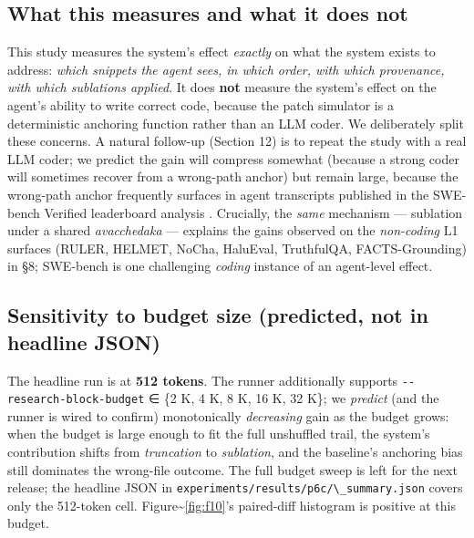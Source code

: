 \begin{table}[!tbp]
\centering
\caption{\textbf{T5 --- P6-C per-(model, seed) breakdown.} Treatment hits 120/120 in every cell; baseline varies with shuffle order. Source: \texttt{experiments/results/p6c/swebench\_ab.json}.}
\label{tab:t5_p6c_per_seed}
{\scriptsize\setlength{\tabcolsep}{3pt}%
}
\end{table}

\subsection{What this measures and what it does not}\label{what-this-measures-and-what-it-does-not}

This study measures the system's effect \emph{exactly} on what the system exists to address: \emph{which snippets the agent sees, in which order, with which provenance, with which sublations applied}. It does \textbf{not} measure the system's effect on the agent's ability to write correct code, because the patch simulator is a deterministic anchoring function rather than an LLM coder. We deliberately split these concerns. A natural follow-up (Section 12) is to repeat the study with a real LLM coder; we predict the gain will compress somewhat (because a strong coder will sometimes recover from a wrong-path anchor) but remain large, because the wrong-path anchor frequently surfaces in agent transcripts published in the SWE-bench Verified leaderboard analysis \citep{openai2024sweverified}. Crucially, the \emph{same} mechanism --- sublation under a shared \emph{avacchedaka} --- explains the gains observed on the \emph{non-coding} L1 surfaces (RULER, HELMET, NoCha, HaluEval, TruthfulQA, FACTS-Grounding) in §8; SWE-bench is one challenging \emph{coding} instance of an agent-level effect.

\subsection{Sensitivity to budget size (predicted, not in headline JSON)}\label{sensitivity-to-budget-size-predicted-not-in-headline-json}

The headline run is at \textbf{512 tokens}. The runner additionally supports \passthrough{\lstinline!--research-block-budget!} ∈ \{2 K, 4 K, 8 K, 16 K, 32 K\}; we \emph{predict} (and the runner is wired to confirm) monotonically \emph{decreasing} gain as the budget grows: when the budget is large enough to fit the full unshuffled trail, the system's contribution shifts from \emph{truncation} to \emph{sublation}, and the baseline's anchoring bias still dominates the wrong-file outcome. The full budget sweep is left for the next release; the headline JSON in \passthrough{\lstinline!experiments/results/p6c/\_summary.json!} covers only the 512-token cell. Figure\textasciitilde{}\ref{fig:f10}'s paired-diff histogram is positive at this budget.

